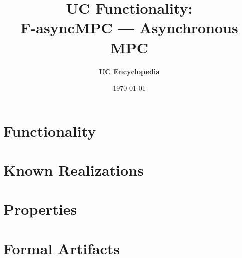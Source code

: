 \documentclass[11pt,a4paper]{article}
\title{\textbf{\Large UC Functionality:}\\[0.2em] \Large F-asyncMPC --- Asynchronous MPC}
\author{\textbf{UC Encyclopedia}}
\date{\today}
\newtheorem{functionality}{Functionality}
\begin{document}
\maketitle

\begin{abstract}
\end{abstract}

\section{Functionality}

%

\section{Known Realizations}


\section{Properties}


\section{Formal Artifacts}

\end{document}

